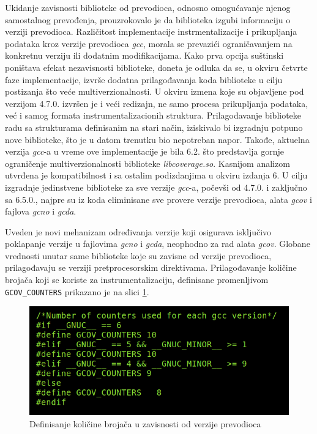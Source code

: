 \documentclass[12pt,oneside]{memoir}
\newcommand{\kod}[1]{\texttt{#1}}
\newcommand{\strano}[1]{\textit{#1}}
\begin{document}
Ukidanje zavisnosti biblioteke od prevodioca, odnosno omogućavanje njenog samostalnog prevođenja, prouzrokovalo je da biblioteka izgubi informaciju o verziji prevodioca. Različitost implementacije instrmentalizacije i prikupljanja podataka kroz verzije prevodioca \strano{gcc}, morala se prevazići ograničavanjem na konkretnu verziju ili dodatnim modifikacijama. Kako prva opcija suštinski poništava efekat nezavisnosti biblioteke, doneta je odluka da se, u okviru četvrte faze implementacije, izvrše dodatna prilagođavanja koda biblioteke u cilju postizanja što veće multiverzionalnosti. U okviru izmena koje su objavljene pod verzijom 4.7.0. izvršen je i veći redizajn, ne samo procesa prikupljanja podataka, već i samog formata instrumentalizacionih struktura. Prilagođavanje biblioteke radu sa strukturama definisanim na stari način, iziskivalo bi izgradnju potpuno nove biblioteke, što je u datom trenutku bio nepotreban napor. Takođe, aktuelna verzija \strano{gcc}-a u vreme ove implementacije je bila 6.2. što predstavlja gornje ograničenje multiverzionalnosti biblioteke \strano{libcoverage.so}. Kasnijom analizom utvrđena je kompatibilnost i sa ostalim podizdanjima u okviru izdanja 6. U cilju izgradnje jedinstvene biblioteke za sve verzije \strano{gcc}-a, počevši od 4.7.0. i zaključno sa 6.5.0., najpre su iz koda eliminisane sve provere verzije prevodioca, alata \strano{gcov} i fajlova \strano{gcno} i \strano{gcda}. 

Uveden je novi mehanizam određivanja verzije koji osigurava isključivo poklapanje verzije u fajlovima \strano{gcno} i \strano{gcda}, neophodno za rad alata \strano{gcov}. 
Globane vrednosti unutar same biblioteke koje su zavisne od verzije prevodioca, prilagođavaju se verziji pretprocesorskim direktivama. Prilagođavanje količine brojača koji se koriste za instrumentalizaciju, definisane promenljivom \kod{GCOV\_COUNTERS} prikazano je na slici \ref{fig:brojaci}.
\\

\begin{figure}[!ht]
  \centering
  \includegraphics[width=\textwidth]{img/GCOV_COUNTERS.png}
  \caption{Definisanje količine brojača u zavisnosti od verzije prevodioca}
  \label{fig:brojaci}
\end{figure}
\end{document}
